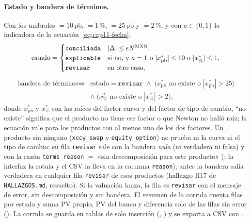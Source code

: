 \paragraph{Estado y bandera de términos.} Con los umbrales  $=10\,\mathrm{pb}$,  $=1\,\%$,  $=25\,\mathrm{pb}$ y  $=2\,\%$, y con $a \in \{0,1\}$ la indicadora de la ecuación~\eqref{eq:cap11-fecha},
\begin{equation}\label{eq:cap11-estado}
  \text{estado} =
  \begin{cases}
    \texttt{conciliada} & |\Delta| \le \epsilon N^{\textup{MXN}},\\
    \texttt{explicable} & \text{si no, y } a = 1 \text{ o } |x^{*}_{\mathrm{pb}}| \le 10 \text{ o } |x^{*}_{\%}| \le 1,\\
    \texttt{revisar} & \text{en otro caso,}
  \end{cases}
\end{equation}
\begin{equation}\label{eq:cap11-terminos}
  \begin{split}
    \text{bandera de términos} \iff{}& \text{estado} = \texttt{revisar} \;\wedge\; \bigl(x^{*}_{\mathrm{pb}} \text{ no existe o } |x^{*}_{\mathrm{pb}}| > 25\bigr)\\
    &\wedge\; \bigl(x^{*}_{\%} \text{ no existe o } |x^{*}_{\%}| > 2\bigr),
  \end{split}
\end{equation}
donde $x^{*}_{\mathrm{pb}}$ y $x^{*}_{\%}$ son las raíces del factor curva y del factor de tipo de cambio, ``no existe'' significa que el producto no tiene ese factor o que Newton no halló raíz; la ecuación vale para los productos con al menos uno de los dos factores. Un producto sin ninguno (\texttt{xccy\_swap} y \texttt{equity\_option}) no prueba ni la curva ni el tipo de cambio: su fila \texttt{revisar} sale con la bandera \emph{nula} (ni verdadera ni falsa) y con la razón \texttt{terms\_reason} $=$ «sin descomposición para este producto» (; la interfaz la rotula y el CSV la lleva en la columna \texttt{reason}); antes la bandera salía verdadera en cualquier fila \texttt{revisar} de esos productos (hallazgo H17 de \texttt{HALLAZGOS.md}, resuelto). Si la valuación lanza, la fila es \texttt{revisar} con el mensaje de error, sin descomposición y sin bandera. El resumen de la corrida cuenta filas por estado y suma PV propio, PV del banco y diferencia solo de las filas sin error (). La corrida se guarda en tablas de solo inserción (, ) y se exporta a CSV con .


